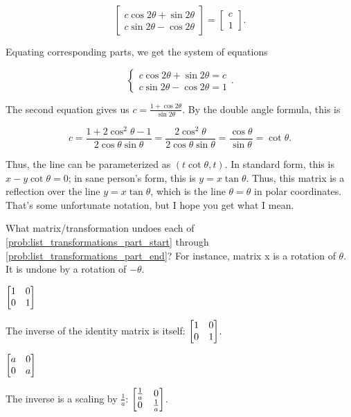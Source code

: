 \documentclass[../gatm_answers.tex]{subfiles}
\begin{document}
$$\begin{bmatrix} c\cos 2\theta + \sin 2\theta \\ c\sin 2\theta - \cos 2\theta \end{bmatrix} = \begin{bmatrix} c \\ 1 \end{bmatrix}.$$

Equating corresponding parts, we get the system of equations

$$\begin{cases} c\cos 2\theta + \sin 2\theta = c \\ c\sin 2\theta - \cos 2\theta = 1 \end{cases}.$$

The second equation gives us $c = \frac{1+\cos 2\theta}{\sin 2\theta}$. By the double angle formula, this is

$$c= \frac{1+2\cos^2\theta - 1}{2\cos\theta\sin\theta} = \frac{2\cos^2\theta}{2\cos\theta\sin\theta} = \frac{\cos\theta}{\sin\theta} = \cot\theta.$$

Thus, the line can be parameterized as $(t\cot\theta, t)$. In standard form, this is $x-y\cot\theta = 0$; in sane person's form, this is $y=x\tan\theta$. Thus, this matrix is a reflection over the line $y=x\tan\theta$, which is the line $\theta = \theta$ in polar coordinates. That's some unfortunate notation, but I hope you get what I mean.

\begin{outer_problem}
\item What matrix/transformation undoes each of \ref{prob:list_transformations_part_start} through \ref{prob:list_transformations_part_end}? For instance, matrix x is a rotation of $\theta$. It is undone by a rotation of $-\theta$.
\end{outer_problem}

\begin{inner_problem}[start=1]
\item $\begin{bmatrix} 1 & 0 \\ 0 & 1 \end{bmatrix}$ \label{prob:list_transformations_part_start}
\end{inner_problem}

The inverse of the identity matrix is itself: $\begin{bmatrix} 1 & 0 \\ 0 & 1 \end{bmatrix}$.

\begin{inner_problem}
\item $\begin{bmatrix} a & 0 \\ 0 & a \end{bmatrix}$
\end{inner_problem}

The inverse is a scaling by $\frac{1}{a}$: $\begin{bmatrix} \frac{1}{a} & 0 \\ 0 & \frac{1}{a} \end{bmatrix}$.
\end{document}
